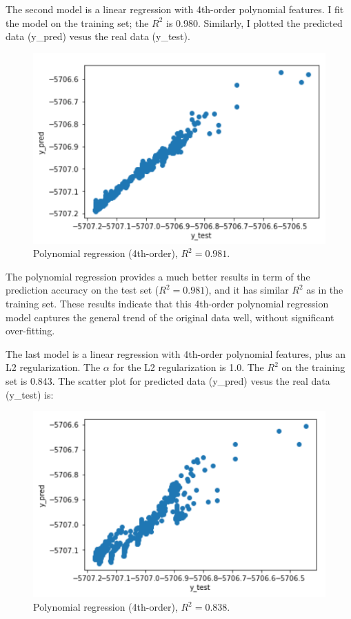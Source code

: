 \documentclass[11pt]{article}
\begin{document}
The second model is a linear regression with 4th-order polynomial features.
I fit the model on the training set; the $R^2$ is 0.980.
Similarly, I plotted the predicted data (y\_pred) vesus the real data (y\_test).
\begin{figure}[h]
\centerline{\includegraphics[scale=0.6]{fit2.png}}
\caption{Polynomial regression (4th-order), $R^2=0.981$.}
\end{figure}
The polynomial regression provides a much better results in term of the prediction accuracy on the test set ($R^2=0.981$), and it has similar $R^2$ as in the training set. These results indicate that this 4th-order polynomial regression model captures the general trend of the original data well, without significant over-fitting.

The last model is a linear regression with 4th-order polynomial features, plus an L2 regularization.
The $\alpha$ for the L2 regularization is 1.0.
The $R^2$ on the training set is 0.843.
The scatter plot for predicted data (y\_pred) vesus the real data (y\_test) is:
\begin{figure}[h]
\centerline{\includegraphics[scale=0.6]{fit3.png}}
\caption{Polynomial regression (4th-order), $R^2=0.838$.}
\end{figure}
\end{document}
